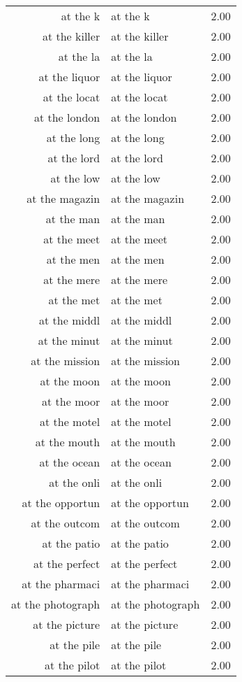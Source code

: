 \begin{table}[ht]
\begin{tabular}{rlr}
  at the k & at the k & 2.00 \\ 
  at the killer & at the killer & 2.00 \\ 
  at the la & at the la & 2.00 \\ 
  at the liquor & at the liquor & 2.00 \\ 
  at the locat & at the locat & 2.00 \\ 
  at the london & at the london & 2.00 \\ 
  at the long & at the long & 2.00 \\ 
  at the lord & at the lord & 2.00 \\ 
  at the low & at the low & 2.00 \\ 
  at the magazin & at the magazin & 2.00 \\ 
  at the man & at the man & 2.00 \\ 
  at the meet & at the meet & 2.00 \\ 
  at the men & at the men & 2.00 \\ 
  at the mere & at the mere & 2.00 \\ 
  at the met & at the met & 2.00 \\ 
  at the middl & at the middl & 2.00 \\ 
  at the minut & at the minut & 2.00 \\ 
  at the mission & at the mission & 2.00 \\ 
  at the moon & at the moon & 2.00 \\ 
  at the moor & at the moor & 2.00 \\ 
  at the motel & at the motel & 2.00 \\ 
  at the mouth & at the mouth & 2.00 \\ 
  at the ocean & at the ocean & 2.00 \\ 
  at the onli & at the onli & 2.00 \\ 
  at the opportun & at the opportun & 2.00 \\ 
  at the outcom & at the outcom & 2.00 \\ 
  at the patio & at the patio & 2.00 \\ 
  at the perfect & at the perfect & 2.00 \\ 
  at the pharmaci & at the pharmaci & 2.00 \\ 
  at the photograph & at the photograph & 2.00 \\ 
  at the picture & at the picture & 2.00 \\ 
  at the pile & at the pile & 2.00 \\ 
  at the pilot & at the pilot & 2.00 \\ 

\end{tabular}
\end{table}
